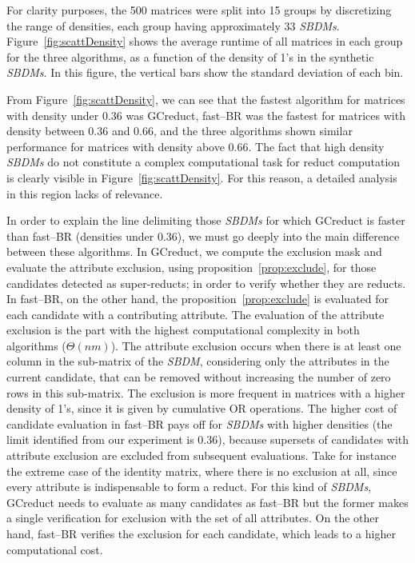 \documentclass[number,preprint,review,12pt]{elsarticle}
\begin{document}
	For clarity purposes, the 500 matrices were split into 15 groups by discretizing the range of densities, each group having approximately 33 \textit{SBDMs}. Figure~\ref{fig:scattDensity} shows the average runtime of all  matrices in each group for the three algorithms, as a function of the density of 1's in the synthetic \textit{SBDMs}. In this figure, the vertical bars show the standard deviation of each bin. 
		
	From Figure~\ref{fig:scattDensity}, we can see that the fastest algorithm for matrices with density under 0.36 was GCreduct, fast--BR was the fastest for matrices with density between 0.36 and 0.66, and the three algorithms shown similar performance for matrices with density above 0.66. The fact that high density \textit{SBDMs} do not constitute a complex computational task for reduct computation \citep{Rojas12} is clearly visible in Figure~\ref{fig:scattDensity}. For this reason, a detailed analysis in this region lacks of relevance.
		
	In order to explain the line delimiting those \textit{SBDMs} for which GCreduct is faster than fast--BR (densities under 0.36), we must go deeply into the main difference between these algorithms. In GCreduct, we compute the exclusion mask and evaluate the attribute exclusion, using proposition~\ref{prop:exclude}, for those candidates detected as super-reducts; in order to verify whether they are reducts. In fast--BR, on the other hand, the proposition~\ref{prop:exclude} is evaluated for each candidate with a contributing attribute. The evaluation of the attribute exclusion is the part with the highest computational complexity in both algorithms ($\Theta (nm)$). The attribute exclusion occurs when there is at least one column in the sub-matrix of the \textit{SBDM}, considering only the attributes in the current candidate, that can be removed without increasing the number of zero rows in this sub-matrix. The exclusion is more frequent in matrices with a higher density of 1's, since it is given by cumulative OR operations. The higher cost of candidate evaluation in fast--BR pays off for \textit{SBDMs} with higher densities (the limit identified from our experiment is 0.36), because supersets of candidates with attribute exclusion are excluded from subsequent evaluations. Take for instance the extreme case of the identity matrix, where there is no exclusion at all, since every attribute is indispensable to form a reduct. For this kind of \textit{SBDMs}, GCreduct needs to evaluate as many candidates as fast--BR but the former makes a single verification for exclusion with the set of all attributes. On the other hand, fast--BR verifies the exclusion for each candidate, which leads to a higher computational cost.
	
\end{document}

